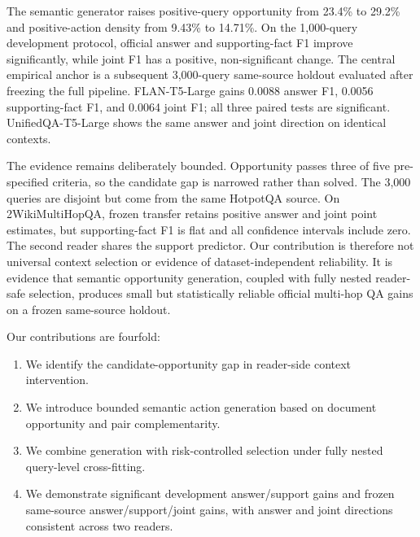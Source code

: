 \documentclass[10pt,twocolumn]{article}
\begin{document}
The semantic generator raises positive-query opportunity from 23.4\% to 29.2\% and positive-action density from 9.43\% to 14.71\%. On the 1,000-query development protocol, official answer and supporting-fact F1 improve significantly, while joint F1 has a positive, non-significant change. The central empirical anchor is a subsequent 3,000-query same-source holdout evaluated after freezing the full pipeline. FLAN-T5-Large gains 0.0088 answer F1, 0.0056 supporting-fact F1, and 0.0064 joint F1; all three paired tests are significant. UnifiedQA-T5-Large shows the same answer and joint direction on identical contexts.

The evidence remains deliberately bounded. Opportunity passes three of five pre-specified criteria, so the candidate gap is narrowed rather than solved. The 3,000 queries are disjoint but come from the same HotpotQA source. On 2WikiMultiHopQA, frozen transfer retains positive answer and joint point estimates, but supporting-fact F1 is flat and all confidence intervals include zero. The second reader shares the support predictor. Our contribution is therefore not universal context selection or evidence of dataset-independent reliability. It is evidence that semantic opportunity generation, coupled with fully nested reader-safe selection, produces small but statistically reliable official multi-hop QA gains on a frozen same-source holdout.

Our contributions are fourfold:

\begin{enumerate}
\item We identify the candidate-opportunity gap in reader-side context intervention.
\item We introduce bounded semantic action generation based on document opportunity and pair complementarity.
\item We combine generation with risk-controlled selection under fully nested query-level cross-fitting.
\item We demonstrate significant development answer/support gains and frozen same-source answer/support/joint gains, with answer and joint directions consistent across two readers.
\end{enumerate}
\end{document}

